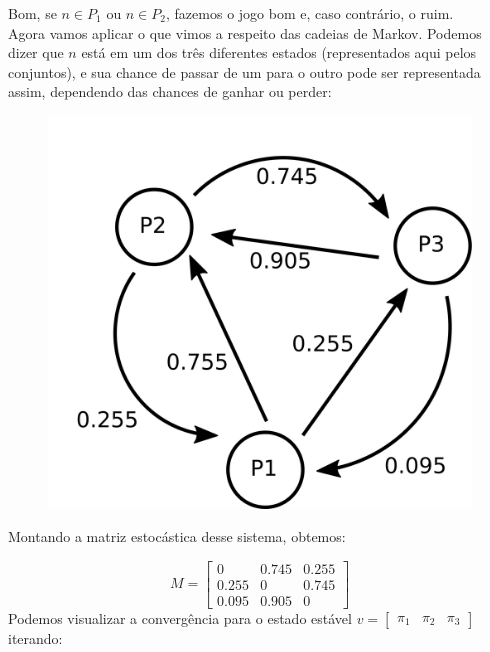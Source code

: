 \documentclass[12pt]{article}
\begin{document}
Bom, se $n \in P_1$ ou $n \in P_2$, fazemos o jogo bom e, caso contrário, o ruim.\\
Agora vamos aplicar o que vimos a respeito das cadeias de Markov. Podemos dizer que $n$ está em um dos três diferentes estados (representados aqui pelos conjuntos), e sua chance de passar de um para o outro pode ser representada assim, dependendo das chances de ganhar ou perder:

\begin{figure}[H]
\centering
\includegraphics[scale=0.7]{fig3.png}
\end{figure}

Montando a matriz estocástica desse sistema, obtemos:

$$
M = 
\begin{bmatrix}
0 & 0.745 & 0.255\\
0.255 & 0 & 0.745\\
0.095 & 0.905 & 0
\end{bmatrix}
$$
Podemos visualizar a convergência para o estado estável $v = \begin{bmatrix} \pi_1 & \pi_2 & \pi_3 \end{bmatrix} $ iterando:
\end{document}
